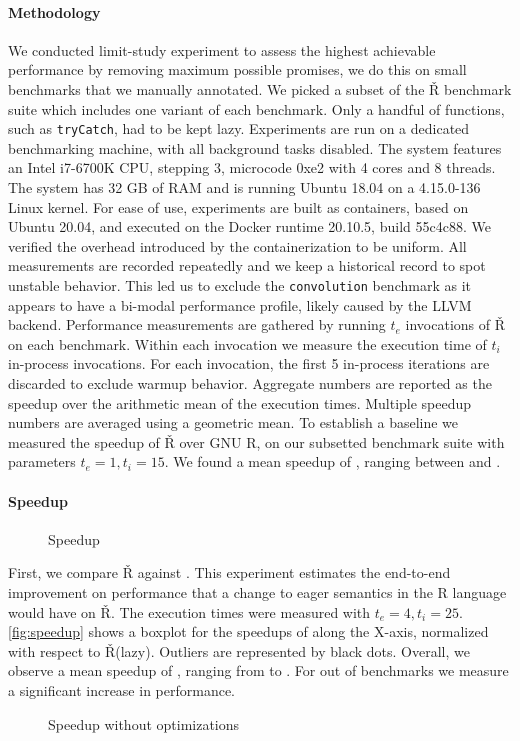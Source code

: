 \documentclass[review,creen,acmsmall]{acmart}
\renewcommand{\Rsh}{{\sf\v R}\xspace}
\begin{document}
\paragraph{Methodology}
We conducted limit-study experiment to assess the highest achievable performance
by removing maximum possible promises, we do this on small benchmarks that we
manually annotated. We picked a subset of the \Rsh benchmark suite which
includes one variant of each benchmark. Only a handful of functions, such as
\lstinline{tryCatch}, had to be kept lazy. Experiments are run on a dedicated
benchmarking machine, with all background tasks disabled. The system features an
Intel i7-6700K CPU, stepping 3, microcode 0xe2 with 4 cores and 8 threads. The
system has 32 GB of RAM and is running Ubuntu 18.04 on a 4.15.0-136 Linux
kernel. For ease of use, experiments are built as containers, based on Ubuntu
20.04, and executed on the Docker runtime 20.10.5, build 55c4c88. We verified
the overhead introduced by the containerization to be uniform. All measurements
are recorded repeatedly and we keep a historical record to spot unstable
behavior. This led us to exclude the \lstinline{convolution} benchmark as it
appears to have a bi-modal performance profile, likely caused by the LLVM
backend.
Performance measurements are gathered by running $t_e$ invocations of \Rsh on
each benchmark. Within each invocation we measure the execution time of $t_i$
in-process invocations. For each invocation, the first 5 in-process iterations
are discarded to exclude warmup behavior. Aggregate numbers are reported as the
speedup over the arithmetic mean of the execution times. Multiple speedup
numbers are averaged using a geometric mean. To establish a baseline we measured
the speedup of \Rsh over GNU R, on our subsetted benchmark suite with parameters
$t_e = 1, t_i = 15$. We found a mean speedup of \speedupRsh, ranging between
\speedupRshMin and \speedupRshMax.

\paragraph{Speedup}

\begin{figure}[h]
  \centering 
  \caption{Speedup} \label{fig:speedup}
\end{figure}

First, we compare \Rsh against \rshstrict. This experiment estimates the
end-to-end improvement on performance that a change to eager semantics in the R
language would have on \Rsh. The execution times were measured with $t_e = 4,
t_i = 25$. \autoref{fig:speedup} shows a boxplot for the speedups of \rshstrict
along the X-axis, normalized with respect to \Rsh (lazy). Outliers are
represented by black dots. Overall, we observe a mean speedup of
\speedupRshStrict, ranging from \speedupRshStrictMin to \speedupRshStrictMax.
For \speedupRshStrictSignificant out of \benchmarkSuiteSize benchmarks we
measure a significant increase in performance.
%
\begin{figure}[h]
  \centering
  
  \caption{Speedup without optimizations}
  \label{fig:speedup-bc}
\end{figure}
%
\end{document}
